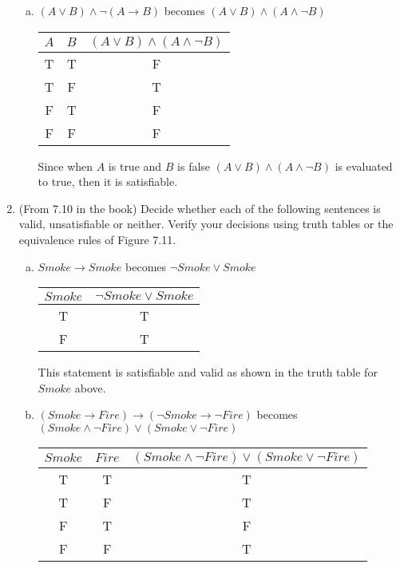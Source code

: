 \documentclass[10pt,draftclsnofoot,onecolumn]{IEEEtran}
\begin{document}
\begin{enumerate}
\begin{enumerate}[a)]
    \item \( (A \lor B) \land \neg (A \rightarrow B) \) becomes \( (A \lor B) \land (A \land \neg B) \) \\

    \begin{tabular}{|c|c|c|}
      \hline
      \( A \) & \( B \) & \(  (A \lor B) \land (A \land \neg B) \)  \\
      \hline
      T & T & F \\
      T & F & T \\
      F & T & F \\
      F & F & F \\
      \hline
    \end{tabular} \medskip %

    Since when \( A \) is true and \( B \) is false \(  (A \lor B) \land (A \land \neg B) \) is evaluated to true, then it is satisfiable.

  \end{enumerate}

  \item (From 7.10 in the book) Decide whether each of the following sentences is valid, unsatisfiable or neither.
  Verify your decisions using truth tables or the equivalence rules of Figure 7.11.
  \begin{enumerate}[a)]
    \item \( Smoke \rightarrow Smoke \) becomes \( \neg Smoke \lor Smoke \) \\

    \begin{tabular}{|c|c|}
      \hline
      \( Smoke \) & \( \neg Smoke \lor Smoke \)  \\
      \hline
      T & T \\
      F & T \\
      \hline
    \end{tabular} \medskip %

    This statement is satisfiable and valid as shown in the truth table for \( Smoke \) above. \\

    \item \( (Smoke \rightarrow Fire) \rightarrow (\neg Smoke \rightarrow \neg Fire) \) becomes \( (Smoke \land \neg Fire) \lor (Smoke \lor \neg Fire) \) \\

    \begin{tabular}{|c|c|c|}
      \hline
      \( Smoke \) & \( Fire \) & \( (Smoke \land \neg Fire) \lor (Smoke \lor \neg Fire) \)  \\
      \hline
      T & T & T \\
      T & F & T \\
      F & T & F \\
      F & F & T \\
      \hline
    \end{tabular} \medskip %


\end{enumerate}
\end{enumerate}
\end{document}
